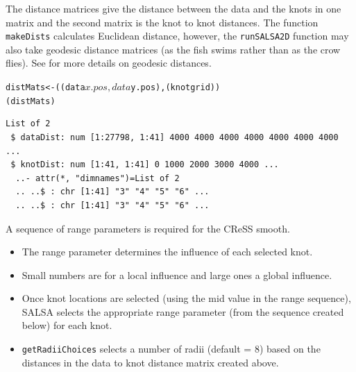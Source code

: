 \begin{frame}[fragile]
\noindent The distance matrices give the distance between the data and the knots in one matrix and the second matrix is the knot to knot distances.  The function {\tt makeDists} calculates Euclidean distance, however, the {\tt runSALSA2D} function may also take geodesic distance matrices (as the fish swims rather than as the crow flies).  See \citet{ScottH2013} for more details on geodesic distances.

\begin{knitrout}\footnotesize
{}\color{fgcolor}\begin{kframe}
\begin{alltt}
distMats <- ((data$x.pos, data$y.pos), (knotgrid))
(distMats)
\end{alltt}
\begin{verbatim}
List of 2
 $ dataDist: num [1:27798, 1:41] 4000 4000 4000 4000 4000 4000 4000 ...
 $ knotDist: num [1:41, 1:41] 0 1000 2000 3000 4000 ...
  ..- attr(*, "dimnames")=List of 2
  .. ..$ : chr [1:41] "3" "4" "5" "6" ...
  .. ..$ : chr [1:41] "3" "4" "5" "6" ...
\end{verbatim}
\end{kframe}
\end{knitrout}

\noindent A sequence of range parameters is required for the CReSS smooth.  
\begin{itemize}
\item The range parameter determines the influence of each selected knot.  
\item Small numbers are for a local influence and large ones a global influence.
\item Once knot locations are selected (using the mid value in the range sequence), SALSA selects the appropriate range parameter (from the sequence created below) for each knot.
\item {\tt getRadiiChoices} selects a number of radii (default = 8) based on the distances in the data to knot distance matrix created above.
\end{itemize}
\begin{knitrout}\footnotesize
{}\color{fgcolor}
\end{knitrout}
\end{frame}

